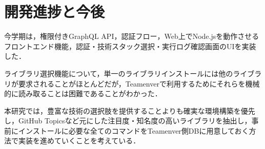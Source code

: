 \documentclass[main]{subfiles}
\begin{document}
\section{開発進捗と今後}
 今学期は，権限付きGraphQL API，認証フロー，Web上でNode.jsを動作させるフロントエンド機能，認証・技術スタック選択・実行ログ確認画面のUIを実装した．

 ライブラリ選択機能について，単一のライブラリインストールには他のライブラリが要求されることがほとんどだが，Teamenverで利用するためにそれらを機械的に読み取ることは困難であることがわかった．

 本研究では，豊富な技術の選択肢を提供することよりも確実な環境構築を優先し，GitHub Topicsなど元にした注目度・知名度の高いライブラリを抽出し，事前にインストールに必要な全てのコマンドをTeamenver側DBに用意しておく方法で実装を進めていくことを考えている．
\end{document}
